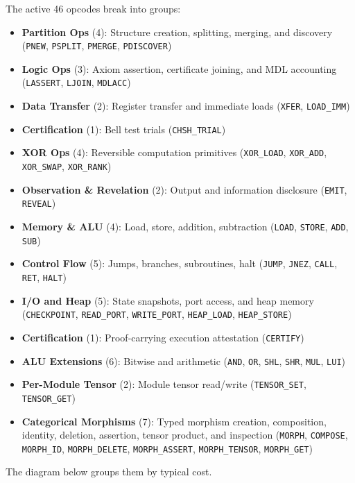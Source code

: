 The active 46 opcodes break into groups:
\begin{itemize}
    \item \textbf{Partition Ops} (4): Structure creation, splitting, merging, and discovery (\texttt{PNEW}, \texttt{PSPLIT}, \texttt{PMERGE}, \texttt{PDISCOVER})
    \item \textbf{Logic Ops} (3): Axiom assertion, certificate joining, and MDL accounting (\texttt{LASSERT}, \texttt{LJOIN}, \texttt{MDLACC})
    \item \textbf{Data Transfer} (2): Register transfer and immediate loads (\texttt{XFER}, \texttt{LOAD\_IMM})
    \item \textbf{Certification} (1): Bell test trials (\texttt{CHSH\_TRIAL})
    \item \textbf{XOR Ops} (4): Reversible computation primitives (\texttt{XOR\_LOAD}, \texttt{XOR\_ADD}, \texttt{XOR\_SWAP}, \texttt{XOR\_RANK})
    \item \textbf{Observation \& Revelation} (2): Output and information disclosure (\texttt{EMIT}, \texttt{REVEAL})
    \item \textbf{Memory \& ALU} (4): Load, store, addition, subtraction (\texttt{LOAD}, \texttt{STORE}, \texttt{ADD}, \texttt{SUB})
    \item \textbf{Control Flow} (5): Jumps, branches, subroutines, halt (\texttt{JUMP}, \texttt{JNEZ}, \texttt{CALL}, \texttt{RET}, \texttt{HALT})
    \item \textbf{I/O and Heap} (5): State snapshots, port access, and heap memory (\texttt{CHECKPOINT}, \texttt{READ\_PORT}, \texttt{WRITE\_PORT}, \texttt{HEAP\_LOAD}, \texttt{HEAP\_STORE})
    \item \textbf{Certification} (1): Proof-carrying execution attestation (\texttt{CERTIFY})
    \item \textbf{ALU Extensions} (6): Bitwise and arithmetic (\texttt{AND}, \texttt{OR}, \texttt{SHL}, \texttt{SHR}, \texttt{MUL}, \texttt{LUI})
    \item \textbf{Per-Module Tensor} (2): Module tensor read/write (\texttt{TENSOR\_SET}, \texttt{TENSOR\_GET})
    \item \textbf{Categorical Morphisms} (7): Typed morphism creation, composition, identity, deletion, assertion, tensor product, and inspection (\texttt{MORPH}, \texttt{COMPOSE}, \texttt{MORPH\_ID}, \texttt{MORPH\_DELETE}, \texttt{MORPH\_ASSERT}, \texttt{MORPH\_TENSOR}, \texttt{MORPH\_GET})
\end{itemize}
The diagram below groups them by typical cost.

